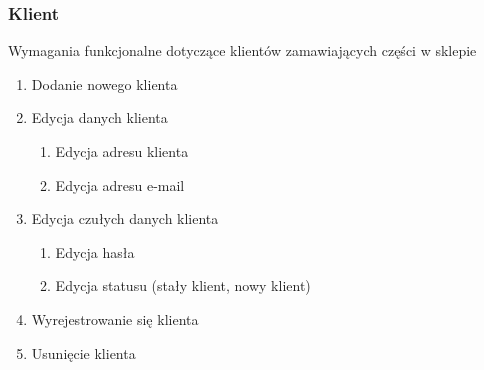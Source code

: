 \subsubsection{Klient}

Wymagania funkcjonalne dotyczące klientów zamawiających części w sklepie

\begin{enumerate}
  \item Dodanie nowego klienta
  \item Edycja danych klienta
  \begin{enumerate}
    \item Edycja adresu klienta
    \item Edycja adresu e-mail
  \end{enumerate}
  \item Edycja czułych danych klienta
  \begin{enumerate}
    \item Edycja hasła
    \item Edycja statusu (stały klient, nowy klient)
  \end{enumerate}
  \item Wyrejestrowanie się klienta
  \item Usunięcie klienta
\end{enumerate}

